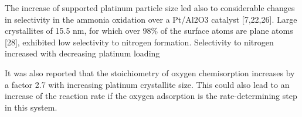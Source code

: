 The increase of supported platinum particle size led also to considerable changes in selectivity in the ammonia oxidation over a Pt/Al2O3 catalyst [7,22,26].
Large crystallites of 15.5 nm, for which over 98\% of the surface atoms are plane atoms [28], exhibited low selectivity to nitrogen formation. Selectivity to nitrogen increased with decreasing platinum loading

It was also reported that the stoichiometry of oxygen chemisorption increases by a factor 2.7 with increasing platinum crystallite size. This could also lead to an increase of the reaction rate if the oxygen adsorption is the rate-determining step in this system.
